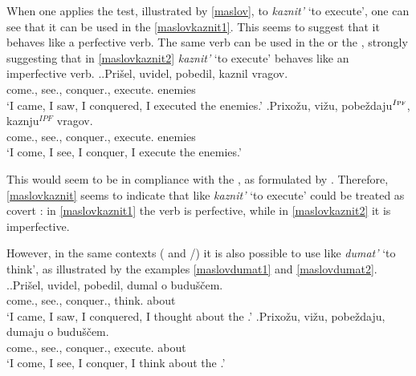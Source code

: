 When one applies the test, illustrated by \ref{maslov}, to \textit{kaznit'} `to execute', one can see that it can be used in the   \ref{maslovkaznit1}. This seems to suggest that it behaves like a perfective verb. The same verb can be used in the  or the  , strongly suggesting that in \ref{maslovkaznit2} \textit{kaznit'} `to execute' behaves like an imperfective verb.
\ex.\label{maslovkaznit}\ag.\label{maslovkaznit1}Pri\v{s}el\textsuperscript{\PF}, uvidel\textsuperscript{\PF}, pobedil\textsuperscript{\PF}, kaznil\textsuperscript{\PF} vragov.\\
come., see., conquer., execute. enemies\\
\trans `I came, I saw, I conquered, I executed the enemies.'
\bg.\label{maslovkaznit2}Prixo\v{z}u\textsuperscript{\IPF}, vi\v{z}u\textsuperscript{\IPF}, pobe\v{z}daju$^{I{\textsc{pf}}}$, kaznju$^{IPF}$ vragov.\\
come., see., conquer., execute. enemies\\
\trans `I come, I see, I conquer, I execute the enemies.'

This would seem to be in compliance with the , as formulated by \citet{Mikaelian:07}. Therefore, \ref{maslovkaznit} seems to indicate that  like \textit{kaznit'} `to execute' could be treated as covert : in \ref{maslovkaznit1} the verb is perfective, while in \ref{maslovkaznit2} it is imperfective.

However, in the same contexts ( and \slash {}) it is also possible to use  like \textit{dumat'} `to think', as illustrated by the examples \ref{maslovdumat1} and \ref{maslovdumat2}.
\ex.\label{maslovdumat}\ag.\label{maslovdumat1}Pri\v{s}el\textsuperscript{\PF}, uvidel\textsuperscript{\PF}, pobedil\textsuperscript{\PF}, dumal\textsuperscript{\IPF} o budu\v{s}\v{c}em.\\
come., see., conquer., think. about \\
\trans `I came, I saw, I conquered, I thought about the .'
\bg.\label{maslovdumat2}Prixo\v{z}u\textsuperscript{\IPF}, vi\v{z}u\textsuperscript{\IPF}, pobe\v{z}daju\textsuperscript{\IPF}, dumaju\textsuperscript{\IPF} o budu\v{s}\v{c}em.\\
come., see., conquer., execute. about \\
\trans `I come, I see, I conquer, I think about the .'

